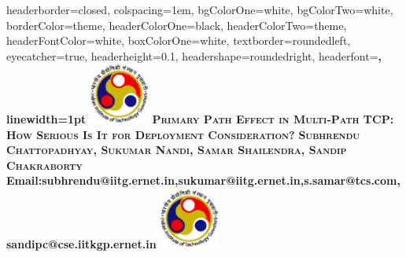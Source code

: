 \documentclass[landscape,a0paper,fontscale=0.48]{baposter}
\begin{document}
\begin{poster}
{
headerborder=closed, %
colspacing=1em, %
bgColorOne=white, %
bgColorTwo=white, %
borderColor=theme, %
headerColorOne=black, %
headerColorTwo=theme, %
headerFontColor=white, %
boxColorOne=white, %
textborder=roundedleft, %
eyecatcher=true, %
headerheight=0.1\textheight, %
headershape=roundedright, %
headerfont=\LARGE\bf\textsc, %
linewidth=1pt %
}
%
{\includegraphics[height=2cm]{Logo/iitg_logo.eps}} %
{\bf\textsc{Primary Path Effect in Multi-Path TCP: How Serious Is It for Deployment Consideration?}\vspace{0.5em}} %
{\bf{\textsc{ Subhrendu Chattopadhyay, Sukumar Nandi, Samar Shailendra, Sandip Chakraborty}}\\
\bf{{Email:{subhrendu@iitg.ernet.in,sukumar@iitg.ernet.in,s.samar@tcs.com,sandipc@cse.iitkgp.ernet.in}}}}
{\includegraphics[height=2cm]{Logo/iitg_logo.eps}} %

\end{poster}
\end{document}
